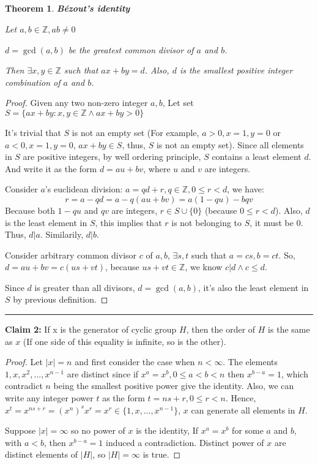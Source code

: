 \documentclass[12pt]{article}
\newtheorem{theorem}{Theorem}
\begin{document}
\subsection{} %
\begin{theorem} \textbf{Bézout's identity}

Let $a,b\in\mathbb{Z},ab\ne0$

$d=\gcd{(a,b)}$ be the greatest common divisor of $a$ and $b$. 

Then $\exists x,y\in\mathbb{Z}$ such that $ax+by=d$. Also, $d$ is the smallest positive integer combination of $a$ and $b$.
\end{theorem}
\begin{proof}

Given any two non-zero integer $a,b$, Let set $S=\{ax+by:x,y\in\mathbb{Z}\land ax+by>0\}$

It's trivial that $S$ is not an empty set (For example, $a>0,x=1,y=0$ or $a<0,x=1,y=0$, $ax+by\in S$, thus, $S$ is not an empty set). Since all elements in $S$ are positive integers, by well ordering principle, $S$ contains a least element $d$. And write it as the form $d=au+bv$, where $u$ and $v$ are integers.

Consider $a$'s euclidean division: $a=qd+r, q\in\mathbb{Z}, 0\le r < d$, we have:
\[r=a-qd=a-q(au+bv)=a(1-qu)-bqv\]
Because both $1-qu$ and $qv$ are integers, $r\in S\cup \{0\}$ (because $0\le r < d$). Also, $d$ is the least element in $S$, this implies that $r$ is not belonging to $S$, it must be $0$. Thus, $d|a$. Similarily, $d|b$.

Consider arbitrary common divisor $c$ of $a,b$, $\exists s,t$ such that $a=cs,b=ct$. So, $d=au+bv=c(us+vt)$, because $us+vt\in \mathbb{Z}$, we know $c|d\land c\le d$.

Since $d$ is greater than all divisors, $d=\gcd{(a,b)}$, it's also the least element in $S$ by previous definition.
\end{proof}

\noindent\rule{\textwidth}{1pt}

\noindent \textbf{Claim 2: } If x is the generator of cyclic group $H$, then the order of $H$ is the same as $x$ (If one side of this equality is infinite, so is the other).
\begin{proof}
Let $|x|=n$ and first consider the case when $n<\infty$. The elements $1,x,x^2,\dots,x^{n-1}$ are distinct since if $x^a=x^b,0\le a<b<n$ then $x^{b-a}=1$, which contradict $n$ being the smallest positive power give the identity. Also, we can write any integer power $t$ as the form $t=ns+r,0\le r<n$. Hence, $x^t=x^{ns+r}=(x^n)^sx^r=x^r\in\{1,x,\dots,x^{n-1}\}$, $x$ can generate all elements in $H$.

Suppose $|x|=\infty$ so no power of $x$ is the identity, If $x^a=x^b$ for some $a$ and $b$, with $a<b$, then $x^{b-a}=1$ induced a contradiction. Distinct power of $x$ are distinct elements of $|H|$, so $|H|=\infty$ is true.
\end{proof}
\end{document}
